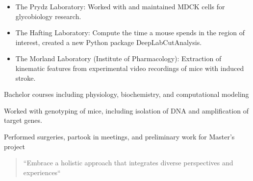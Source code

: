\documentclass[10pt,a4paper,ragged2e,withhyper]{AltaCV/altacv}
\begin{document}
\begin{paracol}{2}
\newpage


		\begin{itemize}
			\item The Prydz Laboratory: Worked with and maintained MDCK cells for glycobiology research.
			\item The Hafting Laboratory: Compute the time a mouse spends in the region of interest, created a new Python package DeepLabCutAnalysis.
			\item The Morland Laboratory (Institute of Pharmacology): Extraction of kinematic features from experimental video recordings of mice with induced stroke.
		\end{itemize}

	\divider

		Bachelor courses including physiology, biochemistry, and computational modeling

	\divider

		Worked with genotyping of mice, including isolation of DNA and amplification of target genes.

	\divider

		Performed surgeries, partook in meetings, and preliminary work for Master's project

	\switchcolumn

		\begin{quote}
			``Embrace a holistic approach that integrates diverse perspectives and experiences``
		\end{quote}

	
		


\end{paracol}
\end{document}
